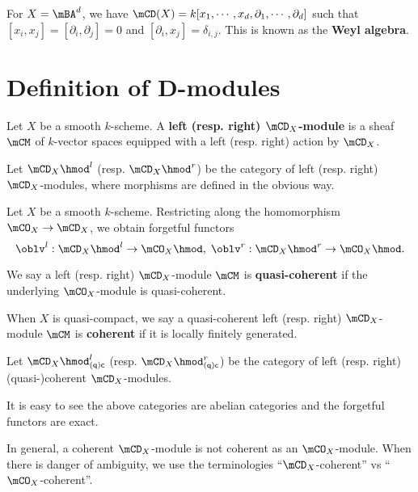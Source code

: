 	\begin{exam}
		For $X=\mBA^d$, we have $\mCD(X) = k[x_1,\cdots,x_d, \partial_1,\cdots,\partial_d]$ such that $[x_i,x_j]=[\partial_i,\partial_j] =0$ and $[\partial_i,x_j]=\delta_{i,j}$. This is known as the \textbf{Weyl algebra}.
	\end{exam}

	

\section{Definition of D-modules}

	\begin{defn}
		Let $X$ be a smooth $k$-scheme. A \textbf{left (resp. right) $\mCD_X$-module} is a sheaf $\mCM$ of $k$-vector spaces equipped with a left (resp. right) action by $\mCD_X$.

		Let $\mCD_X\hmod^l$ (resp. $\mCD_X\hmod^r$) be the category of left (resp. right) $\mCD_X$-modules, where morphisms are defined in the obvious way.
	\end{defn}

	\begin{constr}
		Let $X$ be a smooth $k$-scheme. Restricting along the homomorphism $\mCO_X \to \mCD_X$, we obtain forgetful functors
		\[
			\oblv^l: \mCD_X\hmod^l\to \mCO_X\hmod,\; \oblv^r: \mCD_X\hmod^r\to \mCO_X\hmod.
		\]
		
	\end{constr}

	\begin{defn}
		We say a left (resp. right) $\mCD_X$-module $\mCM$ is \textbf{quasi-coherent} if the underlying $\mCO_X$-module is quasi-coherent.

		When $X$ is quasi-compact, we say a quasi-coherent left (resp. right) $\mCD_X$-module $\mCM$ is \textbf{coherent} if it is locally finitely generated.

		Let $\mCD_X\hmod_{\mathsf{(q)c}}^l$ (resp. $\mCD_X\hmod_{\mathsf{(q)c}}^r$) be the category of left (resp. right) (quasi-)coherent $\mCD_X$-modules.

	\end{defn}

	\begin{rem}
		It is easy to see the above categories are abelian categories and the forgetful functors are exact.
	\end{rem}

	\begin{warn}
		In general, a coherent $\mCD_X$-module is not coherent as an $\mCO_X$-module. When there is danger of ambiguity, we use the terminologies ``$\mCD_X$-coherent'' vs ``$\mCO_X$-coherent''.
	\end{warn}

